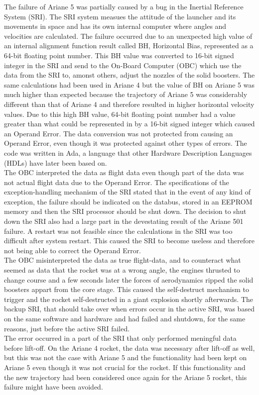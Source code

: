 The failure of Ariane 5 was partially caused by a bug in the Inertial Reference System (SRI). The SRI system measues the attitude of the launcher and its movements in space and has its own internal computer where angles and velocities are calculated.
The failure occurred due to an unexpected high value of an internal alignment function result called BH, Horizontal Bias, represented as a 64-bit floating point number. This BH value was converted to 16-bit signed integer in the SRI and send to the On-Board Computer (OBC) which use the data from the SRI to, amonst others, adjust the nozzles of the solid boosters.
The same calculations had been used in Ariane 4 but the value of BH on Ariane 5 was much higher than expected because the trajectory of Ariane 5 was considerably different than that of Ariane 4 and therefore resulted in higher horizontal velocity values. Due to this high BH value, 64-bit floating point number had a value greater than what could be represented in by a 16-bit signed integer which caused an Operand Error. The data conversion was not protected from causing an Operand Error, even though it was protected against other types of errors. The code was written in Ada, a language that other Hardware Description Languages (HDLs) have later been based on.\\ The OBC interpreted the data as flight data even though part of the data was not actual flight data due to the Operand Error. The specifications of the exception-handling mechanism of the SRI stated that in the event of any kind of exception, the failure should be indicated on the databus, stored in an EEPROM memory and then the SRI processor should be shut down. The decision to shut down the SRI also had a large part in the devestating result of the Ariane 501 failure. A restart was not feasible since the calculations in the SRI was too difficult after system restart. This caused the SRI to become useless and therefore not being able to correct the Operand Error. \\
The OBC misinterpreted the data as true flight-data, and to counteract what seemed as data that the rocket was at a wrong angle, the engines thrusted to change course and a few seconds later the forces of aerodynamics ripped the solid boosters appart from the core stage. This caused the self-destruct mechanism to trigger and the rocket self-destructed in a giant explosion shortly afterwards. The backup SRI, that should take over when errors occur in the active SRI, was based on the same software and hardware and had failed and shutdown, for the same reasons, just before the active SRI failed.\\
The error occurred in a part of the SRI that only performed meningful data before lift-off. On the Ariane 4 rocket, the data was necessary after lift-off as well, but this was not the case with Ariane 5 and the functionality had been kept on Ariane 5 even though it was not crucial for the rocket. If this functionality and the new trajectory had been considered once again for the Ariane 5 rocket, this failure might have been avoided.


